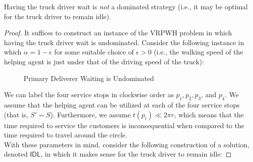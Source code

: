 \documentclass[12pt]{scrartcl}
\begin{document}
\begin{proposition}
 Having the truck driver wait is \textit{not} a dominated strategy (i.e., it may be optimal for the truck driver to remain idle).  
\end{proposition}
\begin{proof}
It suffices to construct an instance of the VRPWH problem in which having the truck driver wait is undominated. Consider the following instance in which $\alpha = 1 - \epsilon$ for some suitable choice of $\epsilon > 0$ (i.e., the walking speed of the helping agent is just under that of the driving speed of the truck):

\begin{figure}[H]
\centering
{}
\caption{Primary Deliverer Waiting is Undominated}
\end{figure}
We can label the four service stops in clockwise order as $p_1, p_2, p_3$, and $p_4$. We assume that the helping agent can be utilized at each of the four service stops (that is, $S' = S$). Furthermore, we assume $t(p_i) \ll 2\pi r$, which means that the time required to service the customers is inconsequential when compared to the time required to travel around the circle. \\

With these parameters in mind, consider the following construction of a solution, denoted $\mathsf{IDL}$, in which it makes sense for the truck driver to remain idle:


\end{proof}
\end{document}
